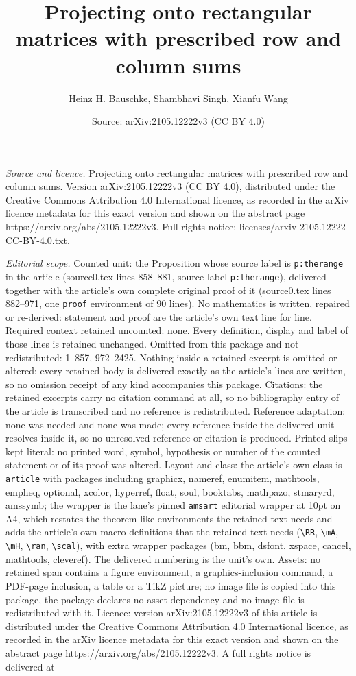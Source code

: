 \documentclass[10pt,a4paper]{amsart}
\title[Projecting onto rectangular matrices with prescribed row and]{Projecting onto rectangular matrices with prescribed row and column sums}
\author{Heinz H. Bauschke, Shambhavi Singh, Xianfu Wang}
\date{Source: arXiv:2105.12222v3 (CC BY 4.0)}
\begin{document}
\maketitle

\noindent\emph{Source and licence.} Projecting onto rectangular matrices with prescribed row and column sums. Version arXiv:2105.12222v3 (CC BY 4.0), distributed under the Creative Commons Attribution 4.0 International licence, as recorded in the arXiv licence metadata for this exact version and shown on the abstract page https://arxiv.org/abs/2105.12222v3. Full rights notice: licenses/arxiv-2105.12222-CC-BY-4.0.txt.\par\smallskip

\noindent\textit{Editorial scope.} Counted unit: the Proposition whose source label is \texttt{p:therange} in the article (source0.tex lines 858--881, source label \texttt{p:therange}), delivered together with the article's own complete original proof of it (source0.tex lines 882--971, one \texttt{proof} environment of 90 lines). No mathematics is written, repaired or re-derived: statement and proof are the article's own text line for line. Required context retained uncounted: none. Every definition, display and label of those lines is retained unchanged. Omitted from this package and not redistributed: 1--857, 972--2425. Nothing inside a retained excerpt is omitted or altered: every retained body is delivered exactly as the article's lines are written, so no omission receipt of any kind accompanies this package. Citations: the retained excerpts carry no citation command at all, so no bibliography entry of the article is transcribed and no reference is redistributed. Reference adaptation: none was needed and none was made; every reference inside the delivered unit resolves inside it, so no unresolved reference or citation is produced. Printed slips kept literal: no printed word, symbol, hypothesis or number of the counted statement or of its proof was altered. Layout and class: the article's own class is \texttt{article} with packages including graphicx, nameref, enumitem, mathtools, empheq, optional, xcolor, hyperref, float, soul, booktabs, mathpazo, stmaryrd, amssymb; the wrapper is the lane's pinned \texttt{amsart} editorial wrapper at 10pt on A4, which restates the theorem-like environments the retained text needs and adds the article's own macro definitions that the retained text needs (\texttt{\textbackslash RR}, \texttt{\textbackslash mA}, \texttt{\textbackslash mH}, \texttt{\textbackslash ran}, \texttt{\textbackslash scal}), with extra wrapper packages (bm, bbm, dsfont, xspace, cancel, mathtools, cleveref). The delivered numbering is the unit's own. Assets: no retained span contains a figure environment, a graphics-inclusion command, a PDF-page inclusion, a table or a TikZ picture; no image file is copied into this package, the package declares no asset dependency and no image file is redistributed with it. Licence: version arXiv:2105.12222v3 of this article is distributed under the Creative Commons Attribution 4.0 International licence, as recorded in the arXiv licence metadata for this exact version and shown on the abstract page https://arxiv.org/abs/2105.12222v3. A full rights notice is delivered at 
\end{document}
